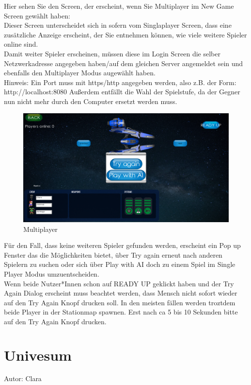 \documentclass[fontsize=12pt,paper=a4,twoside]{scrartcl}
\begin{document}
Hier sehen Sie den Screen, der erscheint, wenn Sie  Multiplayer im New Game Screen gewählt haben:\\
Dieser Screen unterscheidet sich in sofern vom Singlaplayer Screen, dass eine zusätzliche Anzeige erscheint, der Sie entnehmen können, wie viele weitere Spieler online sind.\\
Damit weiter Spieler erscheinen, müssen diese im Login Screen die selber Netzwerkadresse angegeben haben/auf dem gleichen Server angemeldet sein und ebenfalls den Multiplayer Modus augewählt haben.\\
Hinweis: Ein Port muss mit https/http angegeben werden, also z.B. der Form: http://localhost:8080
Außerdem entfällt die Wahl der Spielstufe, da der Gegner nun nicht mehr durch den Computer ersetzt werden muss.

\begin{figure}[htp]
	\centering
	\includegraphics[width=1.00\linewidth]{pics/MultiPlayer01.png}
	\caption{Multiplayer}
	\label{fig1}
\end{figure}

Für den Fall, dass keine weiteren Spieler gefunden werden, erscheint ein Pop up Fenster das die Möglichkeiten bietet, über Try again erneut nach anderen Spielern zu suchen
oder sich über Play with AI doch zu einem Spiel im Single Player Modus umzuentscheiden.\\

Wenn beide Nutzer*Innen schon auf READY UP geklickt haben und der Try Again Dialog erscheint muss beachtet werden, dass Mensch nicht sofort wieder auf den Try Again Knopf drucken soll. In den meisten fällen werden troztdem beide Player in der Stationmap spawnen. Erst nach ca 5 bis 10 Sekunden bitte auf den Try Again Knopf drucken.
 
\newpage
\section{Univesum}
Autor: Clara\\
\end{document}
